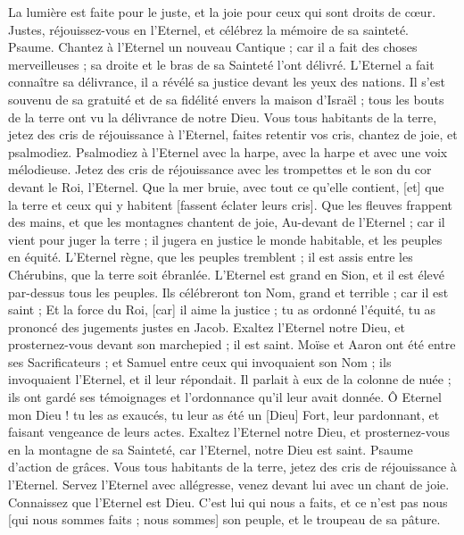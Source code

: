 \begin{multicols}{2}
La lumière est faite pour le juste, et la joie pour ceux qui sont droits de cœur.
Justes, réjouissez-vous en l'Eternel, et célébrez la mémoire de sa sainteté.
\VerseOne{}Psaume. Chantez à l'Eternel un nouveau Cantique ; car il a fait des choses merveilleuses ; sa droite et le bras de sa Sainteté l'ont délivré.
L'Eternel a fait connaître sa délivrance, il a révélé sa justice devant les yeux des nations.
Il s'est souvenu de sa gratuité et de sa fidélité envers la maison d’Israël ; tous les bouts de la terre ont vu la délivrance de notre Dieu.
Vous tous habitants de la terre, jetez des cris de réjouissance à l'Eternel, faites retentir vos cris, chantez de joie, et psalmodiez.
Psalmodiez à l'Eternel avec la harpe, avec la harpe et avec une voix mélodieuse.
Jetez des cris de réjouissance avec les trompettes et le son du cor devant le Roi, l'Eternel.
Que la mer bruie, avec tout ce qu'elle contient, [et] que la terre et ceux qui y habitent [fassent éclater leurs cris].
Que les fleuves frappent des mains, et que les montagnes chantent de joie,
Au-devant de l'Eternel ; car il vient pour juger la terre ; il jugera en justice le monde habitable, et les peuples en équité.
\VerseOne{}L'Eternel règne, que les peuples tremblent ; il est assis entre les Chérubins, que la terre soit ébranlée.
L'Eternel est grand en Sion, et il est élevé par-dessus tous les peuples.
Ils célébreront ton Nom, grand et terrible ; car il est saint ;
Et la force du Roi, [car] il aime la justice ; tu as ordonné l'équité, tu as prononcé des jugements justes en Jacob.
Exaltez l'Eternel notre Dieu, et prosternez-vous devant son marchepied ; il est saint.
Moïse et Aaron ont été entre ses Sacrificateurs ; et Samuel entre ceux qui invoquaient son Nom ; ils invoquaient l'Eternel, et il leur répondait.
Il parlait à eux de la colonne de nuée ; ils ont gardé ses témoignages et l'ordonnance qu'il leur avait donnée.
Ô Eternel mon Dieu ! tu les as exaucés, tu leur as été un [Dieu] Fort, leur pardonnant, et faisant vengeance de leurs actes.
Exaltez l'Eternel notre Dieu, et prosternez-vous en la montagne de sa Sainteté, car l'Eternel, notre Dieu est saint.
\VerseOne{}Psaume d'action de grâces. Vous tous habitants de la terre, jetez des cris de réjouissance à l'Eternel.
Servez l'Eternel avec allégresse, venez devant lui avec un chant de joie.
Connaissez que l'Eternel est Dieu. C'est lui qui nous a faits, et ce n'est pas nous [qui nous sommes faits ; nous sommes] son peuple, et le troupeau de sa pâture.

\end{multicols}
